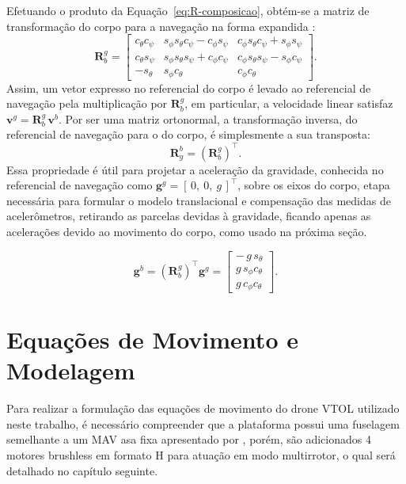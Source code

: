 Efetuando o produto da Equação~\eqref{eq:R-composicao}, obtém-se a matriz de transformação do corpo para a navegação na forma expandida \cite{Farrell2008}:
\begin{equation}
  \mathbf{R}^{g}_{b} =
  \begin{bmatrix}
    c_\theta c_\psi & s_\phi s_\theta c_\psi - c_\phi s_\psi & c_\phi s_\theta c_\psi + s_\phi s_\psi \\[2pt]
    c_\theta s_\psi & s_\phi s_\theta s_\psi + c_\phi c_\psi & c_\phi s_\theta s_\psi - s_\phi c_\psi \\[2pt]
    -s_\theta & s_\phi c_\theta & c_\phi c_\theta
  \end{bmatrix}\!.
  \label{eq:R-corpo-nav}
\end{equation}
Assim, um vetor expresso no referencial do corpo é levado ao referencial de navegação pela multiplicação por $\mathbf{R}^{g}_{b}$, em particular, a velocidade linear satisfaz $\mathbf{v}^{g} = \mathbf{R}^{g}_{b}\,\mathbf{v}^{b}$. Por ser uma matriz ortonormal, a transformação inversa, do referencial de navegação para o do corpo, é simplesmente a sua transposta:
\begin{equation}
  \mathbf{R}^{b}_{g} = \left(\mathbf{R}^{g}_{b}\right)^{\!\top}.
  \label{eq:R-inversa}
\end{equation}
Essa propriedade é útil para projetar a aceleração da gravidade, conhecida no referencial de navegação como $\mathbf{g}^{g} = [\,0,\ 0,\ g\,]^{\top}$, sobre os eixos do corpo, etapa necessária para formular o modelo translacional e compensação das medidas de acelerômetros, retirando as parcelas devidas à gravidade, ficando apenas as acelerações devido ao movimento do corpo, como usado na próxima seção.

\begin{equation}
  \mathbf{g}^{b} = \left(\mathbf{R}^{g}_{b}\right)^{\!\top} \mathbf{g}^{g}
  = \begin{bmatrix} -\,g\,s_\theta \\ g\,s_\phi c_\theta \\ g\,c_\phi c_\theta \end{bmatrix}\!.
  \label{eq:g-corpo}
\end{equation}

\section{Equações de Movimento e Modelagem}

Para realizar a formulação das equações de movimento do drone VTOL utilizado neste trabalho, é necessário compreender que a plataforma possui uma fuselagem semelhante a um MAV asa fixa apresentado por \textcite{Beard2012}, porém, são adicionados 4 motores brushless em formato H para atuação em modo multirrotor, o qual será detalhado no capítulo seguinte. 

